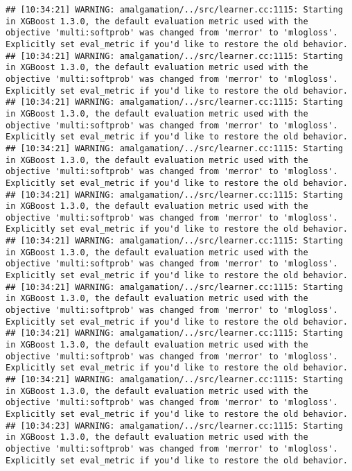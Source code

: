 \documentclass[
]{scrbook}
\begin{document}
\begin{verbatim}
## [10:34:21] WARNING: amalgamation/../src/learner.cc:1115: Starting in XGBoost 1.3.0, the default evaluation metric used with the objective 'multi:softprob' was changed from 'merror' to 'mlogloss'. Explicitly set eval_metric if you'd like to restore the old behavior.
## [10:34:21] WARNING: amalgamation/../src/learner.cc:1115: Starting in XGBoost 1.3.0, the default evaluation metric used with the objective 'multi:softprob' was changed from 'merror' to 'mlogloss'. Explicitly set eval_metric if you'd like to restore the old behavior.
## [10:34:21] WARNING: amalgamation/../src/learner.cc:1115: Starting in XGBoost 1.3.0, the default evaluation metric used with the objective 'multi:softprob' was changed from 'merror' to 'mlogloss'. Explicitly set eval_metric if you'd like to restore the old behavior.
## [10:34:21] WARNING: amalgamation/../src/learner.cc:1115: Starting in XGBoost 1.3.0, the default evaluation metric used with the objective 'multi:softprob' was changed from 'merror' to 'mlogloss'. Explicitly set eval_metric if you'd like to restore the old behavior.
## [10:34:21] WARNING: amalgamation/../src/learner.cc:1115: Starting in XGBoost 1.3.0, the default evaluation metric used with the objective 'multi:softprob' was changed from 'merror' to 'mlogloss'. Explicitly set eval_metric if you'd like to restore the old behavior.
## [10:34:21] WARNING: amalgamation/../src/learner.cc:1115: Starting in XGBoost 1.3.0, the default evaluation metric used with the objective 'multi:softprob' was changed from 'merror' to 'mlogloss'. Explicitly set eval_metric if you'd like to restore the old behavior.
## [10:34:21] WARNING: amalgamation/../src/learner.cc:1115: Starting in XGBoost 1.3.0, the default evaluation metric used with the objective 'multi:softprob' was changed from 'merror' to 'mlogloss'. Explicitly set eval_metric if you'd like to restore the old behavior.
## [10:34:21] WARNING: amalgamation/../src/learner.cc:1115: Starting in XGBoost 1.3.0, the default evaluation metric used with the objective 'multi:softprob' was changed from 'merror' to 'mlogloss'. Explicitly set eval_metric if you'd like to restore the old behavior.
## [10:34:21] WARNING: amalgamation/../src/learner.cc:1115: Starting in XGBoost 1.3.0, the default evaluation metric used with the objective 'multi:softprob' was changed from 'merror' to 'mlogloss'. Explicitly set eval_metric if you'd like to restore the old behavior.
## [10:34:23] WARNING: amalgamation/../src/learner.cc:1115: Starting in XGBoost 1.3.0, the default evaluation metric used with the objective 'multi:softprob' was changed from 'merror' to 'mlogloss'. Explicitly set eval_metric if you'd like to restore the old behavior.

\end{verbatim}
\end{document}
